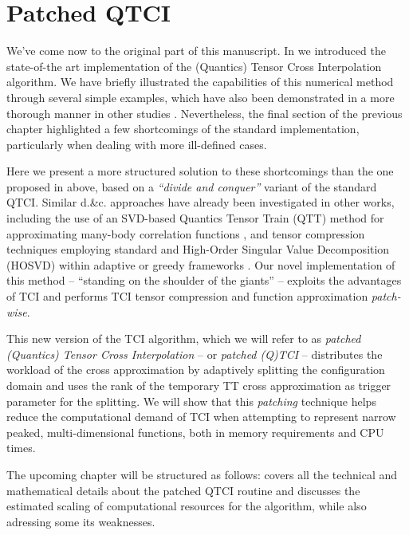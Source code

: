 \chapter{Patched QTCI}
\label{chap:patching}

We've come now to the original part of this manuscript. In  we introduced the state-of-the art implementation of the (Quantics) Tensor Cross Interpolation algorithm. We have briefly illustrated the capabilities of this numerical method through several simple examples, which have also been demonstrated in a more thorough manner in other studies \cite{Fernandez2022, Fernandez2024,
Ritter2024, Jolly2024, Sakurai2025, Oseledets2010, Dolgov2020}. Nevertheless, the final section of the previous chapter highlighted a few shortcomings of the standard implementation, particularly when dealing with more ill-defined cases. 

Here we present a more structured solution to these shortcomings than the one proposed in  above, based on a \textit{``divide and conquer''} variant of the standard QTCI. Similar d.\&c. approaches have already been investigated in other works, including the use of an SVD-based Quantics Tensor Train (QTT) method for approximating many-body correlation functions \cite{Hiroshi2023, Murray2024}, and tensor compression techniques employing standard and High-Order Singular Value Decomposition (HOSVD) within adaptive or greedy frameworks \cite{Ehrlacher2021, FuenteRuizPhDThesis, Ehrlacher2022}. Our novel implementation of this method -- ``standing on the shoulder of the giants'' --  exploits the  advantages of TCI and performs TCI tensor compression and function approximation \textit{patch-wise}. 

This new version of the TCI algorithm, which we will refer to as \textit{patched (Quantics) Tensor Cross Interpolation} -- or \textit{patched (Q)TCI} -- distributes the workload of the cross approximation by adaptively splitting the configuration domain and uses the rank of the temporary TT cross approximation as trigger parameter for the splitting. We will show that this \textit{patching} technique helps reduce the computational demand of TCI when attempting to represent narrow peaked, multi-dimensional functions, both in memory requirements and CPU times. 

The upcoming chapter will be structured as follows:  covers all the technical and mathematical details about the patched QTCI routine and  discusses the estimated scaling of computational resources for the algorithm, while also adressing some its weaknesses.

